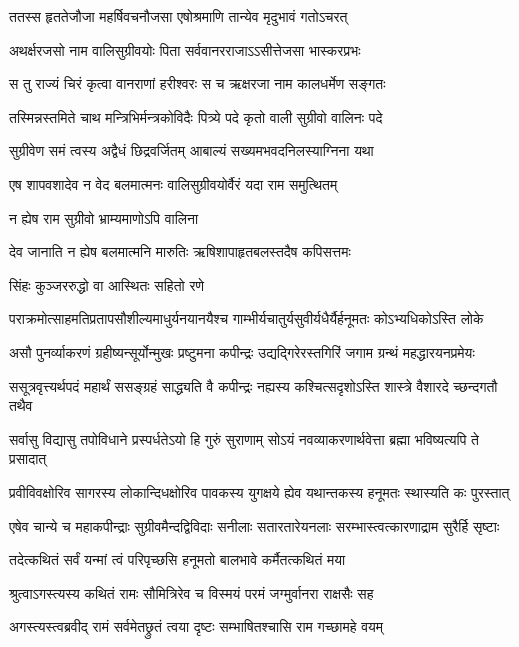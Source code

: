 \twolineshloka
{ततस्स हृततेजौजा महर्षिवचनौजसा}
{एषोश्रमाणि तान्येव मृदुभावं गतोऽचरत्} %

\twolineshloka
{अथर्क्षरजसो नाम वालिसुग्रीवयोः पिता}
{सर्ववानरराजाऽऽसीत्तेजसा भास्करप्रभः} %

\twolineshloka
{स तु राज्यं चिरं कृत्वा वानराणां हरीश्वरः}
{स च ऋक्षरजा नाम कालधर्मेण सङ्गतः} %

\twolineshloka
{तस्मिन्नस्तमिते चाथ मन्त्रिभिर्मन्त्रकोविदैः}
{पित्र्ये पदे कृतो वाली सुग्रीवो वालिनः पदे} %

\twolineshloka
{सुग्रीवेण समं त्वस्य अद्वैधं छिद्रवर्जितम्}
{आबाल्यं सख्यमभवदनिलस्याग्निना यथा} %

\twolineshloka
{एष शापवशादेव न वेद बलमात्मनः}
{वालिसुग्रीवयोर्वैरं यदा राम समुत्थितम्} %

\onelineshloka
{न ह्येष राम सुग्रीवो भ्राम्यमाणोऽपि वालिना} %

\twolineshloka
{देव जानाति न ह्येष बलमात्मनि मारुतिः}
{ऋषिशापाहृतबलस्तदैष कपिसत्तमः} %

\onelineshloka
{सिंहः कुञ्जररुद्धो वा आस्थितः सहितो रणे} %

\twolineshloka
{पराक्रमोत्साहमतिप्रतापसौशील्यमाधुर्यनयानयैश्च}
{गाम्भीर्यचातुर्यसुवीर्यधैर्यैर्हनूमतः कोऽभ्यधिकोऽस्ति लोके} %

\twolineshloka
{असौ पुनर्व्याकरणं ग्रहीष्यन्सूर्योन्मुखः प्रष्टुमना कपीन्द्रः}
{उद्यद्गिरेरस्तगिरिं जगाम ग्रन्थं महद्धारयनप्रमेयः} %

\twolineshloka
{ससूत्रवृत्त्यर्थपदं महार्थं ससङ्ग्रहं साद्ध्यति वै कपीन्द्रः}
{नह्यस्य कश्चित्सदृशोऽस्ति शास्त्रे वैशारदे च्छन्दगतौ तथैव} %

\twolineshloka
{सर्वासु विद्यासु तपोविधाने प्रस्पर्धतेऽयो हि गुरुं सुराणाम्}
{सोऽयं नवव्याकरणार्थवेत्ता ब्रह्मा भविष्यत्यपि ते प्रसादात्} %

\onelineshloka
{प्रवीविवक्षोरिव सागरस्य लोकान्दिधक्षोरिव पावकस्य युगक्षये ह्येव यथान्तकस्य हनूमतः स्थास्यति कः पुरस्तात्} %

\twolineshloka
{एषेव चान्ये च महाकपीन्द्राः सुग्रीवमैन्दद्विविदाः सनीलाः}
{सतारतारेयनलाः सरम्भास्त्वत्कारणाद्राम सुरैर्हि सृष्टाः} %

\twolineshloka
{तदेत्कथितं सर्वं यन्मां त्वं परिपृच्छसि}
{हनूमतो बालभावे कर्मैतत्कथितं मया} %

\twolineshloka
{श्रुत्वाऽगस्त्यस्य कथितं रामः सौमित्रिरेव च}
{विस्मयं परमं जग्मुर्वानरा राक्षसैः सह} %

\twolineshloka
{अगस्त्यस्त्वब्रवीद् रामं सर्वमेतछ्रुतं त्वया}
{दृष्टः सम्भाषितश्चासि राम गच्छामहे वयम्} %

